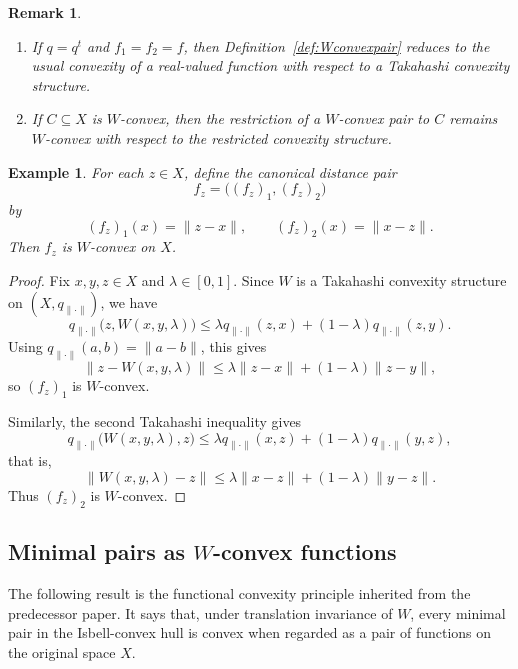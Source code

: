 \documentclass[preprint,12pt]{elsarticle}
\numberwithin{equation}{section}
\newtheorem{remark}[theorem]{Remark}
\newtheorem{example}[theorem]{Example}
\begin{document}
\begin{remark}\label{rem:Wconvexpair-basic}
\begin{enumerate}[label=(\alph*),leftmargin=2.2em]
\item If \(q=q^t\) and \(f_1=f_2=f\), then
Definition~\ref{def:Wconvexpair} reduces to the usual convexity of a
real-valued function with respect to a Takahashi convexity structure.

\item If \(C\subseteq X\) is \(W\)-convex, then the restriction of a
\(W\)-convex pair to \(C\) remains \(W\)-convex with respect to the restricted
convexity structure.
\end{enumerate}
\end{remark}

\begin{example}\label{ex:distpair}
For each \(z\in X\), define the canonical distance pair
\[
f_z=\bigl((f_z)_1,(f_z)_2\bigr)
\]
by
\[
(f_z)_1(x)=\|z-x\|,
\qquad
(f_z)_2(x)=\|x-z\|.
\]
Then \(f_z\) is \(W\)-convex on \(X\).
\end{example}

\begin{proof}
Fix \(x,y,z\in X\) and \(\lambda\in[0,1]\).  Since \(W\) is a Takahashi
convexity structure on \((X,q_{\|\cdot\|})\), we have
\[
q_{\|\cdot\|}\bigl(z,W(x,y,\lambda)\bigr)
\le
\lambda q_{\|\cdot\|}(z,x)+(1-\lambda)q_{\|\cdot\|}(z,y).
\]
Using \(q_{\|\cdot\|}(a,b)=\|a-b\|\), this gives
\[
\|z-W(x,y,\lambda)\|
\le
\lambda\|z-x\|+(1-\lambda)\|z-y\|,
\]
so \((f_z)_1\) is \(W\)-convex.

Similarly, the second Takahashi inequality gives
\[
q_{\|\cdot\|}\bigl(W(x,y,\lambda),z\bigr)
\le
\lambda q_{\|\cdot\|}(x,z)+(1-\lambda)q_{\|\cdot\|}(y,z),
\]
that is,
\[
\|W(x,y,\lambda)-z\|
\le
\lambda\|x-z\|+(1-\lambda)\|y-z\|.
\]
Thus \((f_z)_2\) is \(W\)-convex.
\end{proof}

\subsection{Minimal pairs as \texorpdfstring{\(W\)}{W}-convex functions}

The following result is the functional convexity principle inherited from the
predecessor paper.  It says that, under translation invariance of \(W\), every
minimal pair in the Isbell-convex hull is convex when regarded as a pair of
functions on the original space \(X\).
\end{document}
